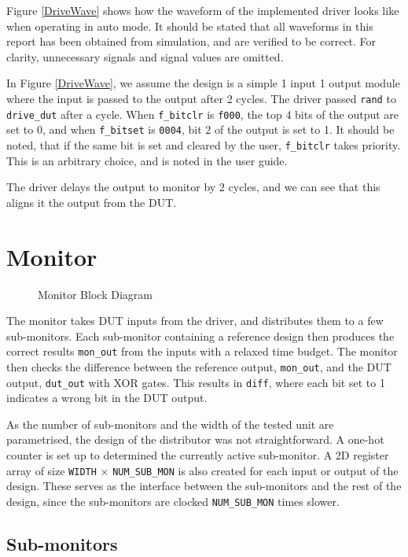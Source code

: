 Figure \ref{DriveWave} shows how the waveform of the implemented driver looks like when operating in auto mode.
It should be stated that all waveforms in this report has been obtained from simulation, and are verified to be correct.
For clarity, unnecessary signals and signal values are omitted.

In Figure \ref{DriveWave}, we assume the design is a simple 1 input 1 output module where the input is passed to the output after 2 cycles.
The driver passed \texttt{rand} to \texttt{drive\_dut} after a cycle.
When \texttt{f\_bitclr} is \texttt{f000}, the top 4 bits of the output are set to 0, and when \texttt{f\_bitset} is \texttt{0004}, bit 2 of the output is set to 1.
It should be noted, that if the same bit is set and cleared by the user, \texttt{f\_bitclr} takes priority.
This is an arbitrary choice, and is noted in the user guide.

The driver delays the output to monitor by 2 cycles, and we can see that this aligns it the output from the DUT.

\section{Monitor}
\begin{figure}[H]
  \centering
  
  \caption{Monitor Block Diagram}
  \label{MonitorBlk}
\end{figure}

The monitor takes DUT inputs from the driver, and distributes them to a few sub-monitors.
Each sub-monitor containing a reference design then produces the correct results \texttt{mon\_out} from the inputs with a relaxed time budget.
The monitor then checks the difference between the reference output, \texttt{mon\_out}, and the DUT output, \texttt{dut\_out} with XOR gates.
This results in \texttt{diff}, where each bit set to 1 indicates a wrong bit in the DUT output.

As the number of sub-monitors and the width of the tested unit are parametrised, the design of the distributor was not straightforward.
A one-hot counter is set up to determined the currently active sub-monitor.
A 2D register array of size \texttt{WIDTH} $\times$ \texttt{NUM\_SUB\_MON} is also created for each input or output of the design.
These serves as the interface between the sub-monitors and the rest of the design, since the sub-monitors are clocked \texttt{NUM\_SUB\_MON} times slower.


\subsection{Sub-monitors}

